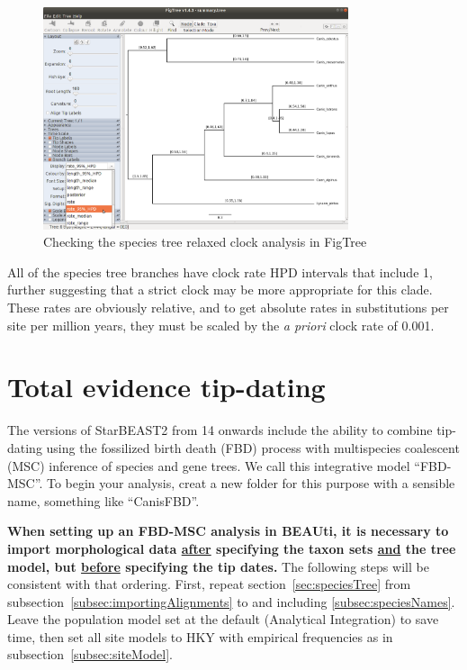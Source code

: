\documentclass[12pt]{article}
\begin{document}
\begin{figure}[htb!]
\centering
\includegraphics[width=0.8\textwidth]{figures/figtreeUCLN.png}
\caption
{Checking the species tree relaxed clock analysis in FigTree}
\label{fig:figtreeUCLN}
\end{figure}

All of the species tree branches have clock rate HPD intervals
that include 1, further suggesting that a strict clock may be more
appropriate for this clade. These rates are obviously relative, and
to get absolute rates in substitutions per site per million years,
they must be scaled by the \textit{a priori} clock rate of 0.001.

\clearpage{}

\section{Total evidence tip-dating}
\label{sec:FBD}

The versions of StarBEAST2 from 14 onwards include the ability to combine
tip-dating using the fossilized birth death (FBD) process with multispecies
coalescent (MSC) inference of species and gene trees. We call this integrative
model ``FBD-MSC''. To begin your analysis, creat a new folder for this
purpose with a sensible name, something like ``CanisFBD''.

\textbf{When setting up an FBD-MSC analysis in BEAUti, it is necessary to
import morphological data \ul{after} specifying the taxon sets \ul{and} the
tree model, but \ul{before} specifying the tip dates.} The following steps
will be consistent with that ordering. First, repeat
section~\ref{sec:speciesTree} from subsection~\ref{subsec:importingAlignments}
to and including \ref{subsec:speciesNames}. Leave the population model set at
the default (Analytical Integration) to save time, then set
all site models to HKY with empirical frequencies as in
subsection~\ref{subsec:siteModel}.
\end{document}
